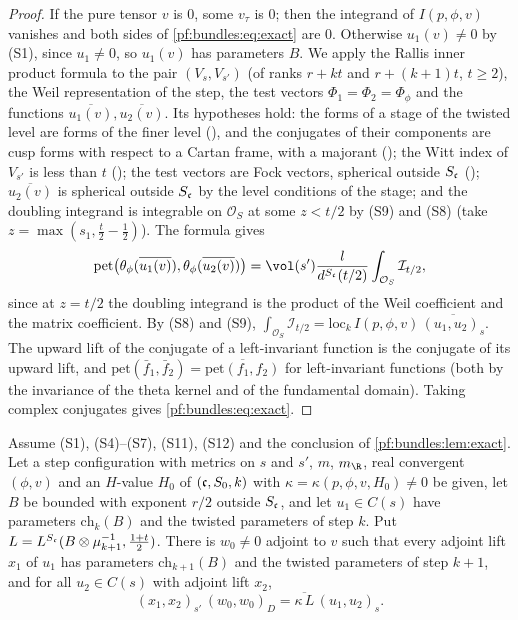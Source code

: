 \begin{proof}
If the pure tensor $v$ is $0$, some $v_\tau$ is $0$; then the integrand of $I(p,\phi,v)$ vanishes and both sides of \eqref{pf:bundles:eq:exact}
are $0$. Otherwise $u_1(v)\ne0$ by (S1), since $u_1\ne0$, so $u_1(v)$ has parameters $B$. We apply the Rallis inner product formula to the pair
$(V_s,V_{s'})$ (of ranks $r+kt$ and $r+(k+1)t$, $t\ge2$), the Weil representation of the step, the test vectors $\Phi_1=\Phi_2=\Phi_\phi$ and the
functions $\overline{u_1(v)},\overline{u_2(v)}$. Its hypotheses hold: the forms of a stage of the twisted level are forms of the finer level
(), and the conjugates of their components are cusp forms with respect
to a Cartan frame, with a majorant (); the Witt index of $V_{s'}$ is less
than $t$ (); the test vectors are Fock vectors, spherical outside
$S_\mathfrak c$ (); $\overline{u_2(v)}$ is spherical outside $S_\mathfrak c$ by the
level conditions of the stage; and the doubling integrand is integrable on $\mathcal O_S$ at some $z<t/2$ by (S9) and (S8) (take
$z=\max(s_1,\frac t2-\frac12)$). The formula gives
\[
\mathrm{pet}\bigl(\theta_\phi(\overline{u_1(v)}),\theta_\phi(\overline{u_2(v)})\bigr)=\vol(s')\frac{l}{d^{S_\bundc}(t/2)}\int_{\mathcal O_S}
\mathcal I_{t/2},
\]
since at $z=t/2$ the doubling integrand is the product of the Weil coefficient and the matrix coefficient. By (S8) and (S9),
$\int_{\mathcal O_S}\mathcal I_{t/2}=\mathrm{loc}_k\,I(p,\phi,v)\,\overline{(u_1,u_2)_s}$. The upward lift of the conjugate of a left-invariant
function is the conjugate of its upward lift, and $\mathrm{pet}(\bar f_1,\bar f_2)=\overline{\mathrm{pet}(f_1,f_2)}$ for left-invariant
functions (both by the invariance of the theta kernel and of the fundamental domain). Taking complex conjugates gives
\eqref{pf:bundles:eq:exact}.
\end{proof}

\begin{lemma}\label{pf:bundles:lem:steplam}
Assume (S1), (S4)--(S7), (S11), (S12) and the conclusion of \cref{pf:bundles:lem:exact}. Let a step configuration with metrics on $s$ and $s'$,
$m$, $m_\R$, real convergent $(\phi,v)$ and an $H$-value $H_0$ of $(\mathfrak c,S_0,k)$ with $\kappa=\kappa(p,\phi,v,H_0)\ne0$ be given, let $B$ be
bounded with exponent $r/2$ outside $S_\mathfrak c$, and let $u_1\in C(s)$ have parameters $\mathrm{ch}_k(B)$ and the twisted parameters of step $k$.
Put $L=L^{S_\mathfrak c}(B\otimes\mu_{k+1}^{-1},\frac{1+t}2)$. There is $w_0\ne0$ adjoint to $v$ such that every adjoint lift $x_1$ of $u_1$ has
parameters $\mathrm{ch}_{k+1}(B)$ and the twisted parameters of step $k+1$, and for all $u_2\in C(s)$ with adjoint lift $x_2$,
\begin{equation}\label{pf:bundles:eq:steplam}
(x_1,x_2)_{s'}\,(w_0,w_0)_D=\overline{\kappa\,L}\,(u_1,u_2)_s .
\end{equation}
\end{lemma}

